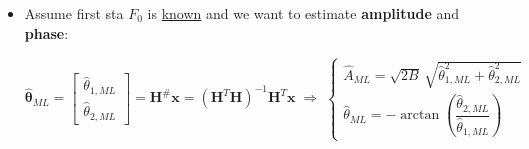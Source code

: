 \begin{itemize}
\[
\underset{N \times 2}{\mathbf{H}}(F_{0})
= \big[\,\mathbf{h}_{1}(F_{0}) \;\; \mathbf{h}_{2}(F_{0})\,\big]
=
\begin{bmatrix}
1 & 0 \\
\cos(2\pi F_{0}) & \sin(2\pi F_{0}) \\
\vdots & \vdots \\
\cos\big(2\pi F_{0}(N-1)\big) &
\sin\big(2\pi F_{0}(N-1)\big)
\end{bmatrix}
\]

\item Assume first sta \(F_0\) is \underline{known} and we want to estimate \textbf{amplitude} and \textbf{phase}:

\[
\hat{\boldsymbol{\theta}}_{ML}
=
\begin{bmatrix}
\hat{\theta}_{1,ML} \\
\hat{\theta}_{2,ML}
\end{bmatrix}
=
\mathbf{H}^{\#}\mathbf{x}
=
(\mathbf{H}^{T}\mathbf{H})^{-1}\mathbf{H}^{T}\mathbf{x}
\;\Rightarrow\;
\begin{cases}
\hat{A}_{ML}
= \sqrt{2B}\,\sqrt{\hat{\theta}_{1,ML}^{2} + \hat{\theta}_{2,ML}^{2}} \\[6pt]
\hat{\theta}_{ML}
= -\arctan\!\left(\dfrac{\hat{\theta}_{2,ML}}{\hat{\theta}_{1,ML}}\right)
\end{cases}
\]


\end{itemize}
